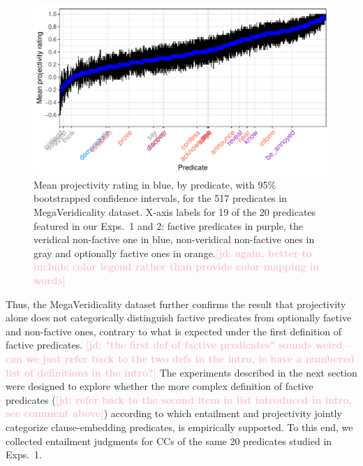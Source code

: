 \documentclass[11pt,fleqn]{article}
\newcommand{\jd}[1]{\textbf{\textcolor{Pink}{[jd: #1]}}}
\newcommand{\6}{\mbox{$[\hspace*{-.6mm}[$}}
\newcommand{\9}{\mbox{$]\hspace*{-.6mm}]$}}
\begin{document}
\begin{figure}[H]
\centering
\includegraphics[width=.75\paperwidth]{../../white-rawlins-data/graphs/means-projection-by-predicate}

\caption{Mean projectivity rating in blue, by predicate, with 95\% bootstrapped confidence intervals, for the 517 predicates in MegaVeridicality dataset. X-axis labels for 19 of the 20 predicates featured in our Exps.~1 and 2: factive predicates in purple, the veridical non-factive one in blue, non-veridical non-factive ones in gray and optionally factive ones in orange.\jd{again, better to include color legend rather than provide color mapping in words}}
\label{f-white-rawlins-projectivity}
\end{figure}

Thus, the MegaVeridicality dataset further confirms the result that projectivity alone does not categorically distinguish factive predicates from optionally factive and non-factive ones, contrary to what is expected under the first definition of factive predicates. \jd{"the first def of factive predicates" sounds weird -- can we just refer back to the two defs in the intro, ie have a numbered list of definitions in the intro?} The experiments described in the next section were designed to explore whether the more complex definition of factive predicates (\jd{refer back to the second item in list introduced in intro, see comment above}) according to which entailment and projectivity jointly categorize clause-embedding predicates,  is empirically supported. To this end, we collected entailment judgments for CCs of the same 20 predicates studied in Exps.~1.
\end{document}
